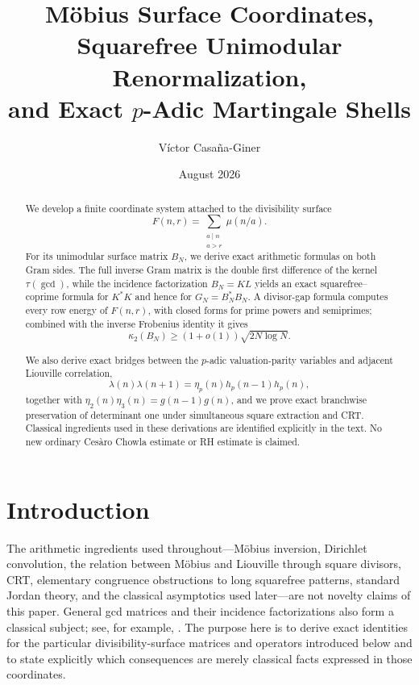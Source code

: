 \documentclass[11pt]{amsart}
\title{Möbius Surface Coordinates, Squarefree Unimodular Renormalization,\\and Exact $p$-Adic Martingale Shells}
\author{Víctor Casaña-Giner}
\date{August 2026}
\numberwithin{equation}{section}
\theoremstyle{plain}
\theoremstyle{definition}
\theoremstyle{remark}
\newcommand{\mob}{\mu}
\newcommand{\liou}{\lambda}
\newcommand{\Fsurf}{F}
\begin{document}
\pagestyle{plain}

\begin{abstract}
We develop a finite coordinate system attached to the divisibility surface
\begin{equation}
\Fsurf(n,r)=\sum_{\substack{a\mid n\\a>r}}\mob(n/a).
\label{eq:abstract_surface}
\end{equation}
For its unimodular surface matrix $B_N$, we derive exact arithmetic formulas on both Gram sides.  The full inverse Gram matrix is the double first difference of the kernel $\tau(\gcd)$, while the incidence factorization $B_N=KL$ yields an exact squarefree--coprime formula for $K^*K$ and hence for $G_N=B_N^*B_N$.  A divisor-gap formula computes every row energy of $F(n,r)$, with closed forms for prime powers and semiprimes; combined with the inverse Frobenius identity it gives
\begin{equation}
\kappa_2(B_N)\ge (1+o(1))\sqrt{2N\log N}.
\label{eq:abstract_condition_number}
\end{equation}

We also derive exact bridges between the $p$-adic valuation-parity variables and adjacent Liouville correlation,
\begin{equation}
\liou(n)\liou(n+1)=\eta_p(n)h_p(n-1)h_p(n),
\label{eq:abstract_eta_lambda_bridge}
\end{equation}
together with $\eta_2(n)\eta_3(n)=g(n-1)g(n)$, and we prove exact branchwise preservation of determinant one under simultaneous square extraction and CRT.  Classical ingredients used in these derivations are identified explicitly in the text.  No new ordinary Cesàro Chowla estimate or RH estimate is claimed.
\end{abstract}

\maketitle
\tableofcontents
\bigskip

\section{Introduction}
\label{sec:introduction}

The arithmetic ingredients used throughout---Möbius inversion, Dirichlet convolution, the relation between Möbius and Liouville through square divisors, CRT, elementary congruence obstructions to long squarefree patterns, standard Jordan theory, and the classical asymptotics used later---are not novelty claims of this paper.  General gcd matrices and their incidence factorizations also form a classical subject; see, for example, \cite{Bhat1991}.  The purpose here is to derive exact identities for the particular divisibility-surface matrices and operators introduced below and to state explicitly which consequences are merely classical facts expressed in those coordinates.
\end{document}
